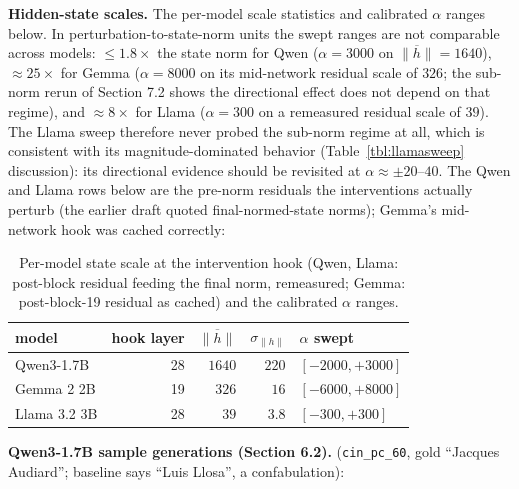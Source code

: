 \textbf{Hidden-state scales.} The per-model scale statistics and
calibrated \(\alpha\) ranges below. In perturbation-to-state-norm units
the swept ranges are not comparable across models: \(\le 1.8\times\)
the state norm for Qwen (\(\alpha = 3000\) on
\(\overline{\|h\|} = 1640\)), \(\approx 25\times\) for Gemma
(\(\alpha = 8000\) on its mid-network residual scale of \(326\);
the sub-norm rerun of Section 7.2 shows the directional effect does
not depend on that regime), and
\(\approx 8\times\) for Llama (\(\alpha = 300\) on a remeasured
residual scale of \(39\)). The Llama sweep therefore never probed the
sub-norm regime at all, which is consistent with its
magnitude-dominated behavior (Table~\ref{tbl:llamasweep} discussion):
its directional evidence should be revisited at
\(\alpha \approx \pm 20\)--\(40\). The Qwen and Llama rows below are
the pre-norm residuals the interventions actually perturb (the earlier
draft quoted final-normed-state norms); Gemma's mid-network hook was
cached correctly:

\begin{table}[!htbp]
\small
\centering
\caption{Per-model state scale at the intervention hook (Qwen, Llama:
post-block residual feeding the final norm, remeasured; Gemma:
post-block-19 residual as cached) and the calibrated \(\alpha\)
ranges.\label{tbl:scales}}
\begin{tabular}{@{}lrrrl@{}}
\toprule
model & hook layer & \(\overline{\|h\|}\) & \(\sigma_{\|h\|}\) & \(\alpha\) swept \\
\midrule
Qwen3-1.7B & 28 & \(1640\) & \(220\) & \([-2000, +3000]\) \\
Gemma 2 2B & 19 & \(326\) & \(16\) & \([-6000, +8000]\) \\
Llama 3.2 3B & 28 & \(39\) & \(3.8\) & \([-300, +300]\) \\
\bottomrule
\end{tabular}
\end{table}

\textbf{Qwen3-1.7B sample generations (Section 6.2).}
(\texttt{cin\_pc\_60}, gold ``Jacques Audiard''; baseline says ``Luis
Llosa'', a confabulation):

